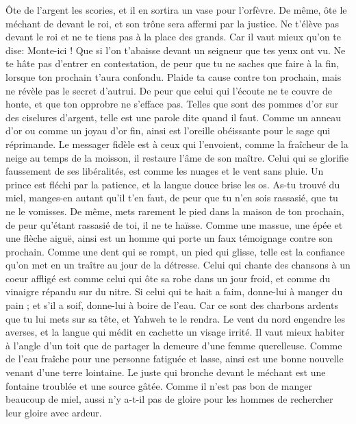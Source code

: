 \begin{multicols}{2}
Ôte de l'argent les scories, et il en sortira un vase pour l’orfèvre.
 De même, ôte le méchant de devant le roi, et son trône sera affermi par la justice.
Ne t’élève pas devant le roi et ne te tiens pas à la place des grands.
Car il vaut mieux qu'on te dise: Monte-ici ! Que si l’on t'abaisse devant un seigneur que tes yeux ont vu.
Ne te hâte pas d’entrer en contestation, de peur que tu ne saches que faire à la fin, lorsque ton prochain t'aura confondu.
Plaide ta cause contre ton prochain, mais ne révèle pas le secret d'autrui.
De peur que celui qui l'écoute ne te couvre de honte, et que ton opprobre ne s'efface pas.
Telles que sont des pommes d'or sur des ciselures d'argent, telle est une parole dite quand il faut.
Comme un anneau d'or ou comme un joyau d’or fin, ainsi est l’oreille obéissante pour le sage qui réprimande.
Le messager fidèle est à ceux qui l'envoient, comme la fraîcheur de la neige au temps de la moisson, il restaure l'âme de son maître.
Celui qui se glorifie faussement de ses libéralités, est comme les nuages et le vent sans pluie.
Un prince est fléchi par la patience, et la langue douce brise les os.
As-tu trouvé du miel, manges-en autant qu'il t’en faut, de peur que tu n'en sois rassasié, que tu ne le vomisses.
De même, mets rarement le pied dans la maison de ton prochain, de peur qu'étant rassasié de toi, il ne te haïsse.
Comme une massue, une épée et une flèche aiguë, ainsi est un homme qui porte un faux témoignage contre son prochain.
Comme une dent qui se rompt, un pied qui glisse, telle est la confiance qu'on met en un traître au jour de la détresse.
Celui qui chante des chansons à un coeur affligé est comme celui qui ôte sa robe dans un jour froid, et comme du vinaigre répandu sur du nitre.
Si celui qui te hait a faim, donne-lui à manger du pain ; et s'il a soif, donne-lui à boire de l'eau.
Car ce sont des charbons ardents que tu lui mets sur sa tête, et Yahweh te le rendra.
Le vent du nord engendre les averses, et la langue qui médit en cachette un visage irrité.
Il vaut mieux habiter à l’angle d'un toit que de partager la demeure d’une femme querelleuse.
Comme de l'eau fraîche pour une personne fatiguée et lasse, ainsi est une bonne nouvelle venant d'une terre lointaine.
Le juste qui bronche devant le méchant est une fontaine troublée et une source gâtée.
Comme il n'est pas bon de manger beaucoup de miel, aussi n'y a-t-il pas de gloire pour les hommes de rechercher leur gloire avec ardeur.

\end{multicols}
